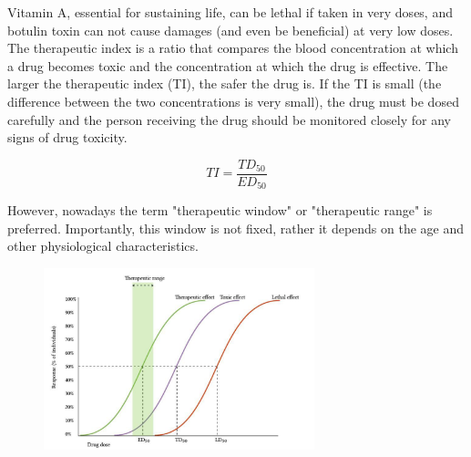 \documentclass{book}
\begin{document}
Vitamin A, essential for sustaining life, can be lethal if taken in very doses, and botulin toxin can not cause damages (and even be beneficial) at very low doses.
\\
The therapeutic index is a ratio that compares the blood concentration at which a drug becomes toxic and the concentration at which the drug is effective. 
The larger the therapeutic index (TI), the safer the drug is. If the TI is small (the difference between the two concentrations is very small), the drug must be dosed carefully and the person receiving the drug should be monitored closely for any signs of drug toxicity.

\begin{equation*}
    TI = \frac{TD_{50}}{ED_{50}}
\end{equation*}

However, nowadays the term "therapeutic window" or "therapeutic range" is preferred.
Importantly, this window is not fixed, rather it depends on the age and other physiological characteristics.

\begin{figure}[H]
    \includegraphics[width=0.7\textwidth, center]{images/image15.png}
    \caption{}
\end{figure}










\printbibliography
\end{document}
